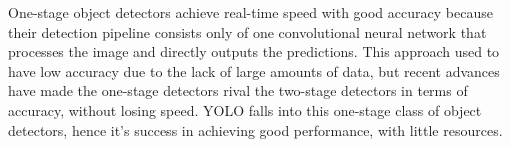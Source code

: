One-stage object detectors achieve real-time speed with good accuracy because their detection pipeline consists only of one convolutional neural network that processes the image and directly outputs the predictions. This approach used to have low accuracy due to the lack of large amounts of data, but recent advances have made the one-stage detectors rival the two-stage detectors in terms of accuracy, without losing speed. YOLO falls into this one-stage class of object detectors, hence it's success in achieving good performance, with little resources.